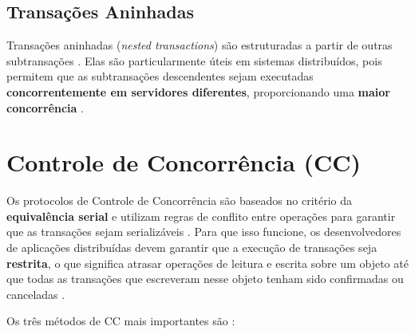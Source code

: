 \documentclass[12pt, a4paper]{article}
\begin{document}
\subsection{Transações Aninhadas}

Transações aninhadas (\textit{nested transactions}) são estruturadas a partir de outras subtransações \cite{432, 615}. Elas são particularmente úteis em sistemas distribuídos, pois permitem que as subtransações descendentes sejam executadas \textbf{concorrentemente em servidores diferentes}, proporcionando uma \textbf{maior concorrência} \cite{432, 615}.

\section{Controle de Concorrência (CC)}

Os protocolos de Controle de Concorrência são baseados no critério da \textbf{equivalência serial} e utilizam regras de conflito entre operações para garantir que as transações sejam serializáveis \cite{615}. Para que isso funcione, os desenvolvedores de aplicações distribuídas devem garantir que a execução de transações seja \textbf{restrita}, o que significa atrasar operações de leitura e escrita sobre um objeto até que todas as transações que escreveram nesse objeto tenham sido confirmadas ou canceladas \cite{390, 407}.

Os três métodos de CC mais importantes são \cite{615, 602}:
\end{document}
